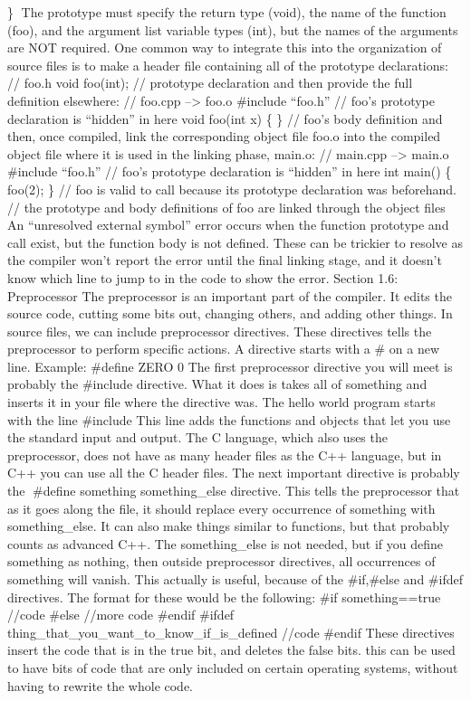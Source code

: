 \} The prototype must specify the return type (void), the name of the
function (foo), and the argument list variable types (int), but the
names of the arguments are NOT required. One common way to integrate
this into the organization of source ﬁles is to make a header ﬁle
containing all of the prototype declarations: // foo.h void foo(int); //
prototype declaration and then provide the full deﬁnition elsewhere: //
foo.cpp --\textgreater{} foo.o \#include ``foo.h'' // foo's prototype
declaration is ``hidden'' in here void foo(int x) \{ \} // foo's body
definition and then, once compiled, link the corresponding object ﬁle
foo.o into the compiled object ﬁle where it is used in the linking
phase, main.o: // main.cpp --\textgreater{} main.o \#include ``foo.h''
// foo's prototype declaration is ``hidden'' in here int main() \{
foo(2); \} // foo is valid to call because its prototype declaration was
beforehand. // the prototype and body definitions of foo are linked
through the object files An ``unresolved external symbol'' error occurs
when the function prototype and call exist, but the function body is not
deﬁned. These can be trickier to resolve as the compiler won't report
the error until the ﬁnal linking stage, and it doesn't know which line
to jump to in the code to show the error. Section 1.6: Preprocessor The
preprocessor is an important part of the compiler. It edits the source
code, cutting some bits out, changing others, and adding other things.
In source ﬁles, we can include preprocessor directives. These directives
tells the preprocessor to perform speciﬁc actions. A directive starts
with a \# on a new line. Example: \#define ZERO 0 The ﬁrst preprocessor
directive you will meet is probably the \#include directive. What it
does is takes all of something and inserts it in your ﬁle where the
directive was. The hello world program starts with the line \#include
This line adds the functions and objects that let you use the standard
input and output. The C language, which also uses the preprocessor, does
not have as many header ﬁles as the C++ language, but in C++ you can use
all the C header ﬁles. The next important directive is probably the
\#define something something\_else directive. This tells the
preprocessor that as it goes along the ﬁle, it should replace every
occurrence of something with something\_else. It can also make things
similar to functions, but that probably counts as advanced C++. The
something\_else is not needed, but if you deﬁne something as nothing,
then outside preprocessor directives, all occurrences of something will
vanish. This actually is useful, because of the \#if,\#else and \#ifdef
directives. The format for these would be the following: \#if
something==true //code \#else //more code \#endif \#ifdef
thing\_that\_you\_want\_to\_know\_if\_is\_defined //code \#endif These
directives insert the code that is in the true bit, and deletes the
false bits. this can be used to have bits of code that are only included
on certain operating systems, without having to rewrite the whole code.

